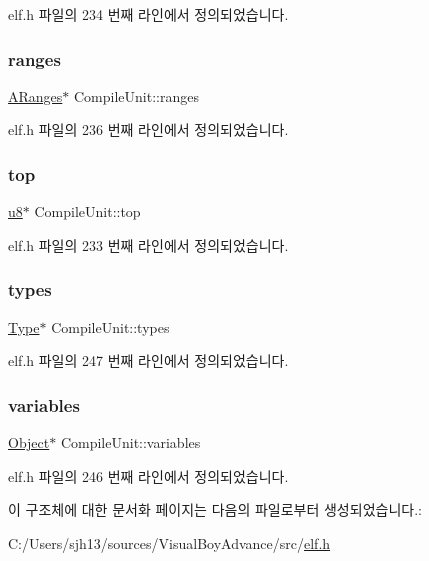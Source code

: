 elf.\+h 파일의 234 번째 라인에서 정의되었습니다.

\mbox{\label{struct_compile_unit_a35a7813d5c734076df26479b66448158}} 
\subsubsection{\texorpdfstring{ranges}{ranges}}
{\footnotesize\ttfamily \mbox{\hyperlink{struct_a_ranges}{A\+Ranges}}$\ast$ Compile\+Unit\+::ranges}



elf.\+h 파일의 236 번째 라인에서 정의되었습니다.

\mbox{\label{struct_compile_unit_ace3ba5846b6ef2bce6fb6ecf08cad32f}} 
\subsubsection{\texorpdfstring{top}{top}}
{\footnotesize\ttfamily \mbox{\hyperlink{_system_8h_aed742c436da53c1080638ce6ef7d13de}{u8}}$\ast$ Compile\+Unit\+::top}



elf.\+h 파일의 233 번째 라인에서 정의되었습니다.

\mbox{\label{struct_compile_unit_ac17b554bb4d11740bf0cd06231d5454c}} 
\subsubsection{\texorpdfstring{types}{types}}
{\footnotesize\ttfamily \mbox{\hyperlink{struct_type}{Type}}$\ast$ Compile\+Unit\+::types}



elf.\+h 파일의 247 번째 라인에서 정의되었습니다.

\mbox{\label{struct_compile_unit_a88643bd86eef23198ee9e03070ed26cb}} 
\subsubsection{\texorpdfstring{variables}{variables}}
{\footnotesize\ttfamily \mbox{\hyperlink{struct_object}{Object}}$\ast$ Compile\+Unit\+::variables}



elf.\+h 파일의 246 번째 라인에서 정의되었습니다.



이 구조체에 대한 문서화 페이지는 다음의 파일로부터 생성되었습니다.\+:\begin{DoxyCompactItemize}
\item 
C\+:/\+Users/sjh13/sources/\+Visual\+Boy\+Advance/src/\mbox{\hyperlink{elf_8h}{elf.\+h}}\end{DoxyCompactItemize}
